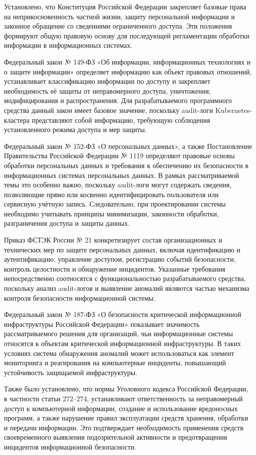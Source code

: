 Установлено, что Конституция Российской Федерации закрепляет базовые права на неприкосновенность частной жизни, защиту персональной информации и законное обращение со сведениями ограниченного доступа. Эти положения формируют общую правовую основу для последующей регламентации обработки информации в информационных системах.

Федеральный закон № 149-ФЗ «Об информации, информационных технологиях и о защите информации» определяет информацию как объект правовых отношений, устанавливает классификацию информации по доступу и закрепляет необходимость её защиты от неправомерного доступа, уничтожения, модифицирования и распространения. Для разрабатываемого программного средства данный закон имеет базовое значение, поскольку audit-логи Kubernetes-кластера представляют собой информацию, требующую соблюдения установленного режима доступа и мер защиты.

Федеральный закон № 152-ФЗ «О персональных данных», а также Постановление Правительства Российской Федерации № 1119 определяют правовые основы обработки персональных данных и требования к обеспечению их безопасности в информационных системах персональных данных. В рамках рассматриваемой темы это особенно важно, поскольку audit-логи могут содержать сведения, позволяющие прямо или косвенно идентифицировать пользователя или сервисную учётную запись. Следовательно, при проектировании системы необходимо учитывать принципы минимизации, законности обработки, разграничения доступа и защиты данных.

Приказ ФСТЭК России № 21 конкретизирует состав организационных и технических мер по защите персональных данных, включая идентификацию и аутентификацию, управление доступом, регистрацию событий безопасности, контроль целостности и обнаружение инцидентов. Указанные требования непосредственно соотносятся с функциональностью разрабатываемого средства, поскольку анализ audit-логов и выявление аномалий являются частью механизма контроля безопасности информационной системы.

Федеральный закон № 187-ФЗ «О безопасности критической информационной инфраструктуры Российской Федерации» показывает значимость рассматриваемого решения для организаций, чьи информационные системы относятся к объектам критической информационной инфраструктуры. В таких условиях система обнаружения аномалий может использоваться как элемент мониторинга и реагирования на компьютерные инциденты, повышающий устойчивость защищаемой инфраструктуры.

Также было установлено, что нормы Уголовного кодекса Российской Федерации, в частности статьи 272–274, устанавливают ответственность за неправомерный доступ к компьютерной информации, создание и использование вредоносных программ, а также нарушение правил эксплуатации средств хранения, обработки и передачи информации. Это подтверждает необходимость применения средств своевременного выявления подозрительной активности и предотвращения инцидентов информационной безопасности.

